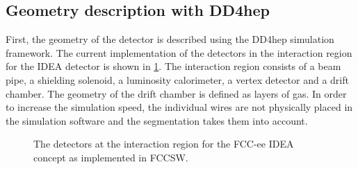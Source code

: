 \documentclass{cernatsnote}
\begin{document}
\subsection{Geometry description with DD4hep}
First, the geometry of the detector is described using the DD4hep simulation framework. The current implementation of the detectors in the interaction region for the IDEA detector is shown in \cref{fig_sim}. The interaction region consists of a beam pipe, a shielding solenoid, a luminosity calorimeter, a vertex detector and a drift chamber. The geometry of the drift chamber is defined as layers of gas. In order to increase the simulation speed, the individual wires are not physically placed in the simulation software and the segmentation takes them into account.

\begin{figure}[!t]
\centering

\caption{The detectors at the interaction region for the FCC-ee IDEA concept as implemented in FCCSW.}
\label{fig_sim}
\end{figure}
\end{document}
